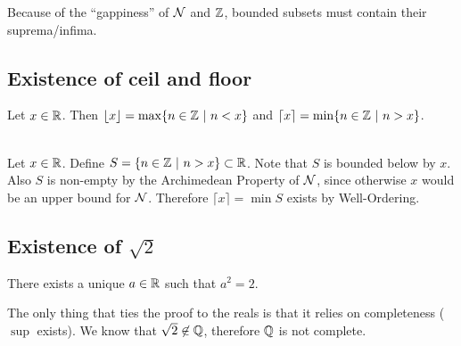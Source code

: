 \begin{intuition*}
  Because of the ``gappiness'' of $\mathcal{N}$ and $\mathbb{Z}$, bounded subsets must contain their suprema/infima.
\end{intuition*}

\subsection{Existence of ceil and floor}
\begin{definition*}
  Let $x \in \mathbb{R}$. Then $\lfloor x \rfloor = \max\{n \in \mathbb{Z} ~|~ n < x\}$ and
  $\lceil x \rceil = \min\{n \in \mathbb{Z} ~|~ n > x\}$.
\end{definition*}

\begin{theorem*}~\\
  Let $x \in \mathbb{R}$. Define $S = \{n \in \mathbb{Z} ~|~ n > x\} \subset \mathbb{R}$. Note that $S$ is bounded below by
  $x$. Also $S$ is non-empty by the Archimedean Property of $\mathcal{N}$, since otherwise $x$ would be an
  upper bound for $\mathcal{N}$. Therefore $\lceil x \rceil = \min S$ exists by Well-Ordering.
\end{theorem*}

\subsection{Existence of $\sqrt 2$}
\begin{theorem*}
  There exists a unique $a \in \mathbb{R}$ such that $a^2 = 2$.
\end{theorem*}

\begin{remark*}
  The only thing that ties the proof to the reals is that it relies on completeness ($\sup$
  exists). We know that $\sqrt 2 \not\in \mathbb{Q}$, therefore $\mathbb{Q}$ is not complete.
\end{remark*}

